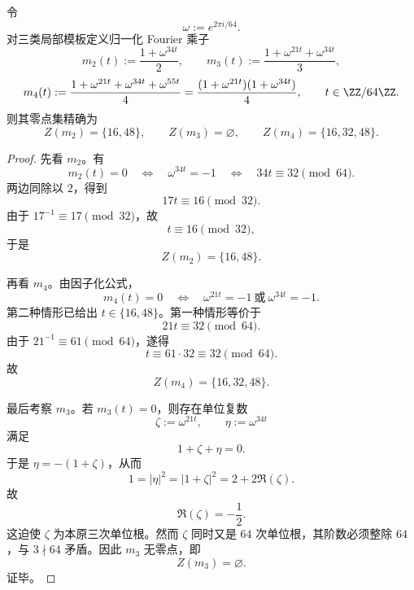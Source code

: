 \begin{theorem}\label{thm:xi-time-part9xab-window6-local-fourier-multipliers-exact-zero-set}
令
\[
\omega:=e^{2\pi i/64}.
\]
对三类局部模板定义归一化 Fourier 乘子
\[
m_2(t):=\frac{1+\omega^{34t}}2,
\qquad
m_3(t):=\frac{1+\omega^{21t}+\omega^{34t}}3,
\]
\[
m_4(t):=\frac{1+\omega^{21t}+\omega^{34t}+\omega^{55t}}4
=
\frac{(1+\omega^{21t})(1+\omega^{34t})}{4},
\qquad
t\in \ZZ/64\ZZ.
\]
则其零点集精确为
\[
Z(m_2)=\{16,48\},
\qquad
Z(m_3)=\varnothing,
\qquad
Z(m_4)=\{16,32,48\}.
\]
\end{theorem}
\begin{proof}
先看 \(m_2\)。有
\[
m_2(t)=0
\quad\Longleftrightarrow\quad
\omega^{34t}=-1
\quad\Longleftrightarrow\quad
34t\equiv 32 \pmod{64}.
\]
两边同除以 \(2\)，得到
\[
17t\equiv 16 \pmod{32}.
\]
由于 \(17^{-1}\equiv 17\pmod{32}\)，故
\[
t\equiv 16 \pmod{32},
\]
于是
\[
Z(m_2)=\{16,48\}.
\]

再看 \(m_4\)。由因子化公式，
\[
m_4(t)=0
\quad\Longleftrightarrow\quad
\omega^{21t}=-1\ \text{或}\ \omega^{34t}=-1.
\]
第二种情形已给出 \(t\in\{16,48\}\)。第一种情形等价于
\[
21t\equiv 32 \pmod{64}.
\]
由于 \(21^{-1}\equiv 61\pmod{64}\)，遂得
\[
t\equiv 61\cdot 32\equiv 32 \pmod{64}.
\]
故
\[
Z(m_4)=\{16,32,48\}.
\]

最后考察 \(m_3\)。若 \(m_3(t)=0\)，则存在单位复数
\[
\zeta:=\omega^{21t},
\qquad
\eta:=\omega^{34t}
\]
满足
\[
1+\zeta+\eta=0.
\]
于是 \(\eta=-(1+\zeta)\)，从而
\[
1=|\eta|^2=|1+\zeta|^2=2+2\Re(\zeta).
\]
故
\[
\Re(\zeta)=-\frac12.
\]
这迫使 \(\zeta\) 为本原三次单位根。然而 \(\zeta\) 同时又是 \(64\) 次单位根，其阶数必须整除 \(64\)，与 \(3\nmid 64\) 矛盾。因此 \(m_3\) 无零点，即
\[
Z(m_3)=\varnothing.
\]
证毕。
\end{proof}

